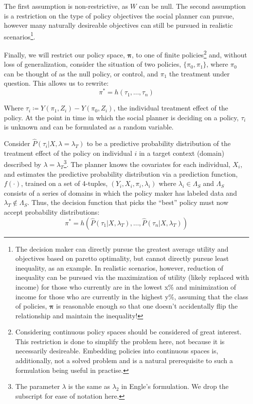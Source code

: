 \documentclass[a4paper,12pt]{article}
\begin{document}
The first assumption is non-restrictive, as $W$ can be null. The second assumption is a restriction on the type of policy objectives the social planner can pursue, however many naturally desireable objectives can still be pursued in realistic scenarios\footnote{The decision maker can directly pursue the greatest average utility and objectives based on paretto optimality, but cannot directly pursue least inequality, as an example. In realistic scenarios, however, reduction of inequality can be pursued via the maximization of utility (likely replaced with income) for those who currently are in the lowest x\% and minimization of income for those who are currently in the highest y\%, assuming that the class of policies, $\bm{\pi}$ is reasonable enough so that one doesn't accidentally flip the relationship and maintain the inequality!}. 

Finally, we will restrict our policy space, $\bm{\pi}$, to one of finite policies\footnote{Considering continuous policy spaces should be considered of great interest. This restriction is done to simplify the problem here, not because it is necessarily desireable. Embedding policies into continuous spaces is, additionally, not a solved problem and is a natural prerequisite to such a formulation being useful in practise.} and, without loss of generalization, consider the situation of two policies, $\{\pi_0, \pi_1\}$, where $\pi_0$ can be thought of as the null policy, or control, and $\pi_1$ the treatment under question. This allows us to rewrite:
%
$$
\pi^* = h(\tau_1,...,\tau_n)
$$

Where $\tau_i \coloneqq Y(\pi_1, Z_{i}) - Y(\pi_0, Z_{i})$, the individual treatment effect of the policy. At the point in time in which the social planner is deciding on a policy, $\tau_i$ is unknown and can be formulated as a random variable. 

Consider $\hat{P}(\tau_i | X, \lambda = \lambda_T)$ to be a predictive probability distribution of the treatment effect of the policy on individual $i$ in a target context (domain) described by $\lambda = \lambda_T$\footnote{The parameter $\lambda$ is the same as $\lambda_2$ in Engle's formulation. We drop the subscript for ease of notation here.}. The planner knows the covariates for each individual, $X_i$, and estimates the predictive probability distribution via a prediction function, $f(\cdot)$, trained on a set of 4-tuples, $(Y_i, X_i, \pi_i, \lambda_i)$ where $\lambda_i \in \Lambda_S$ and $\Lambda_S$ consists of a series of domains in which the policy maker has labeled data and $\lambda_T \not \in \Lambda_S$. Thus, the decision function that picks the ``best'' policy must now accept probability distributions: 
%
$$
\pi^* = h(\hat{P}(\tau_1 | X, \lambda_T),...,\hat{P}(\tau_n | X, \lambda_T))
$$
\end{document}
